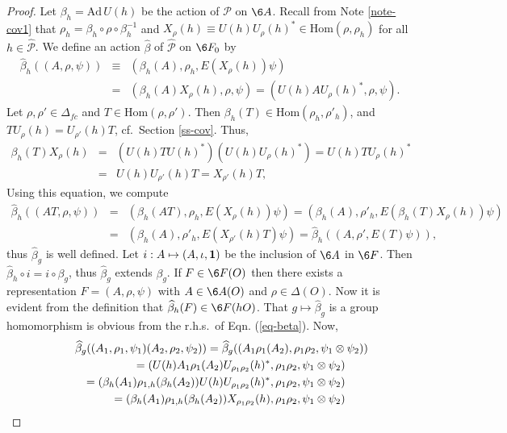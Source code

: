 \documentclass[12pt]{article}
\theoremstyle{definition}
\theoremstyle{definition}
\theoremstyle{remark}
\def\2#1{{\mathcal #1}}
\def\1#1{{\bf #1}}
\newcommand{\Hom}{\mathrm{Hom}}
\begin{document}
\begin{proof} Let $\beta_h=\mathrm{Ad}\,U(h)$ be the action of $\2P$ on $\6A$.
Recall from Note \ref{note-cov1} that $\rho_h=\beta_h\circ\rho\circ\beta_h^{-1}$ and 
$X_\rho(h)\equiv U(h)U_\rho(h)^*\in\Hom(\rho,\rho_h)$ for all $h\in\widehat{\2P}$.
We define an action $\widehat{\beta}$ of $\widehat{\2P}$ on $\6F_0$ by  
\begin{eqnarray} \widehat{\beta}_h((A,\rho,\psi)) &\equiv& (\beta_h(A),\rho_h,E(X_\rho(h))\psi) \nonumber\\
   &=& (\beta_h(A)X_\rho(h),\rho,\psi) =(U(h)AU_\rho(h)^*,\rho,\psi). \label{eq-beta}
\end{eqnarray}
Let $\rho,\rho'\in\Delta_{fc}$ and $T\in\Hom(\rho,\rho')$. Then $\beta_h(T)\in\Hom(\rho_h,\rho'_h)$,
and $TU_\rho(h)=U_{\rho'}(h)T$, cf.\ Section \ref{ss-cov}. Thus,
\begin{eqnarray*} \beta_h(T)X_\rho(h) &=& (U(h)TU(h)^*)(U(h)U_\rho(h)^*)=U(h)TU_\rho(h)^* \\
   &=& U(h)U_{\rho'}(h)T=X_{\rho'}(h)T, \end{eqnarray*}
Using this equation, we compute
\begin{eqnarray*} \widehat{\beta}_h((AT,\rho,\psi)) &=& (\beta_h(AT),\rho_h,E(X_\rho(h))\psi) 
   =  (\beta_h(A),\rho'_h,E(\beta_h(T)X_\rho(h))\psi)  \\
   &=&  (\beta_h(A),\rho'_h,E(X_{\rho'}(h)T)\psi) =  \widehat{\beta}_h((A,\rho',E(T)\psi)),
\end{eqnarray*}
thus $\widehat{\beta}_g$ is well defined. Let $i:A\mapsto(A,\iota,\11)$ be the inclusion of $\6A$ in
$\6F$. Then $\widehat{\beta}_h\circ i=i\circ\beta_g$, thus $\widehat{\beta}_g$ extends $\beta_g$.
If $F\in\6F(O)$ then there exists a representation
$F=(A,\rho,\psi)$ with $A\in\6A(O)$ and $\rho\in\Delta(O)$. Now it is evident from the definition
that $\widehat{\beta}_h(F)\in\6F(hO)$. That $g\mapsto\widehat{\beta}_g$ is a group homomorphism
is obvious from the r.h.s.\ of Eqn. (\ref{eq-beta}). Now,
\begin{eqnarray*} \lefteqn{ \widehat{\beta}_g((A_1,\rho_1,\psi_1)(A_2,\rho_2,\psi_2)) =
   \widehat{\beta}_g((A_1\rho_1(A_2),\rho_1\rho_2,\psi_1\otimes\psi_2)) } \\
  &&= (U(h)A_1\rho_1(A_2)U_{\rho_1\rho_2}(h)^*,\rho_1\rho_2,\psi_1\otimes\psi_2)  \\
  &&= (\beta_h(A_1)\rho_{1,h}(\beta_h(A_2))U(h)U_{\rho_1\rho_2}(h)^*,\rho_1\rho_2,\psi_1\otimes\psi_2) \\
  &&= (\beta_h(A_1)\rho_{1,h}(\beta_h(A_2))X_{\rho_1\rho_2}(h),\rho_1\rho_2,\psi_1\otimes\psi_2) \\

\end{eqnarray*}
\end{proof}
\end{document}
